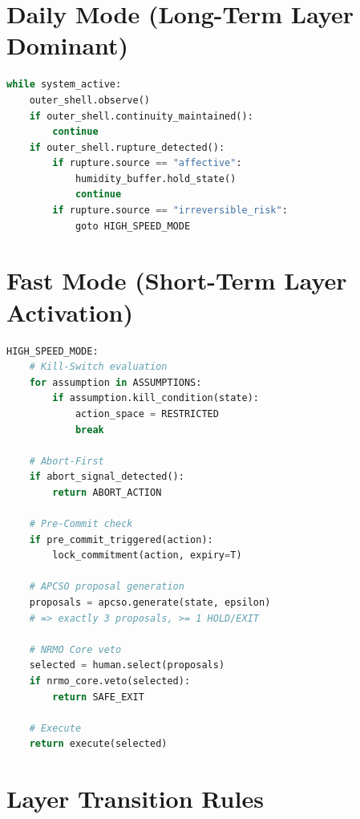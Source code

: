 \section{Daily Mode (Long-Term Layer Dominant)}
\label{sec:integrated-flow-daily}

\begin{lstlisting}[language=Python,basicstyle=\ttfamily\small,frame=single]
while system_active:
    outer_shell.observe()
    if outer_shell.continuity_maintained():
        continue
    if outer_shell.rupture_detected():
        if rupture.source == "affective":
            humidity_buffer.hold_state()
            continue
        if rupture.source == "irreversible_risk":
            goto HIGH_SPEED_MODE
\end{lstlisting}

\section{Fast Mode (Short-Term Layer Activation)}
\label{sec:integrated-flow-fast}

\begin{lstlisting}[language=Python,basicstyle=\ttfamily\small,frame=single]
HIGH_SPEED_MODE:
    # Kill-Switch evaluation
    for assumption in ASSUMPTIONS:
        if assumption.kill_condition(state):
            action_space = RESTRICTED
            break

    # Abort-First
    if abort_signal_detected():
        return ABORT_ACTION

    # Pre-Commit check
    if pre_commit_triggered(action):
        lock_commitment(action, expiry=T)

    # APCSO proposal generation
    proposals = apcso.generate(state, epsilon)
    # => exactly 3 proposals, >= 1 HOLD/EXIT

    # NRMO Core veto
    selected = human.select(proposals)
    if nrmo_core.veto(selected):
        return SAFE_EXIT

    # Execute
    return execute(selected)
\end{lstlisting}

\section{Layer Transition Rules}
\label{sec:integrated-flow-transitions}

